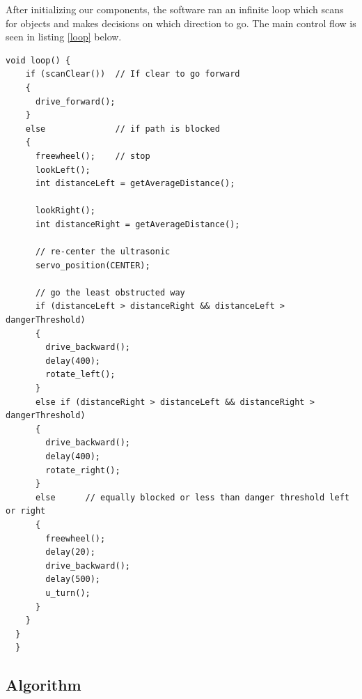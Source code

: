 \documentclass[11pt]{article}
\begin{document}
%

After initializing our components, the software ran an infinite loop which scans for objects and makes decisions on which direction to go.  The main control flow is seen in listing \ref{loop} below.

\vspace{12pt}

 \begin{lstlisting}[caption=Control Loop, label=loop]		
  void loop() {
    if (scanClear())  // If clear to go forward
    {
      drive_forward();
    }
    else              // if path is blocked
    {
      freewheel();    // stop
      lookLeft();
      int distanceLeft = getAverageDistance();

      lookRight();
      int distanceRight = getAverageDistance();
      
      // re-center the ultrasonic
      servo_position(CENTER);

      // go the least obstructed way
      if (distanceLeft > distanceRight && distanceLeft > dangerThreshold)       
      {
        drive_backward();
        delay(400);
        rotate_left();
      }
      else if (distanceRight > distanceLeft && distanceRight > dangerThreshold) 
      {
        drive_backward();
        delay(400);
        rotate_right();
      }
      else 		// equally blocked or less than danger threshold left or right
      {
        freewheel();
        delay(20);
        drive_backward();
        delay(500);
        u_turn();
      }   
    } 
  }  
  }
  \end{lstlisting}


\subsection{Algorithm}

\end{document}
